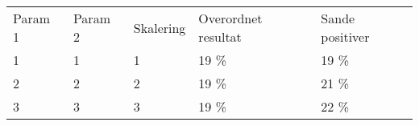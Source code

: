 \begin{tabular}{|l|l|l|l|l|}
\hline
\rowcolor[gray]{0.9} \multicolumn{5}{|>{\columncolor[gray]{0.9}}c|}{\textbf{Kontrolsæt}} \\ \hline
Param 1 & Param 2 & Skalering & Overordnet resultat & Sande positiver\\ \hline
1 & 1 & 1 & 19 \% & 19 \%\\ \hline
2 & 2 & 2 & 19 \% & 21 \% \\ \hline
3 & 3 & 3 & 19 \% & 22 \% \\
\hline
\end{tabular}

\begin{comment}
\subsubsection*{Områder domineret af lyse gråtoner}

\begin{tabular}{|l|l|l|l|l|}
\hline
\rowcolor[gray]{0.9} \multicolumn{5}{|>{\columncolor[gray]{0.9}}c|}{\textbf{Træningssæt}} \\ \hline
Param 1 & Param 2 & Skalering & Overordnet resultat & Sande positiver\\ \hline
1 & 1 & 1 & 19 \% & 19 \%\\ \hline
2 & 2 & 2 & 19 \% & 21 \% \\ \hline
3 & 3 & 3 & 19 \% & 22 \% \\
\hline
\end{tabular}

\begin{tabular}{|l|l|l|l|l|}
\hline
\rowcolor[gray]{0.9} \multicolumn{5}{|>{\columncolor[gray]{0.9}}c|}{\textbf{Kontrolsæt}} \\ \hline
Param 1 & Param 2 & Skalering & Overordnet resultat & Sande positiver\\ \hline
1 & 1 & 1 & 19 \% & 19 \%\\ \hline
2 & 2 & 2 & 19 \% & 21 \% \\ \hline
3 & 3 & 3 & 19 \% & 22 \% \\
\hline
\end{tabular}


\subsubsection*{Områder med høj kontrast}

\begin{tabular}{|l|l|l|l|l|}
\hline
\rowcolor[gray]{0.9} \multicolumn{5}{|>{\columncolor[gray]{0.9}}c|}{\textbf{Træningssæt}} \\ \hline
Param 1 & Param 2 & Skalering & Overordnet resultat & Sande positiver\\ \hline
1 & 1 & 1 & 19 \% & 19 \%\\ \hline
2 & 2 & 2 & 19 \% & 21 \% \\ \hline
3 & 3 & 3 & 19 \% & 22 \% \\
\hline
\end{tabular}


\end{comment}
